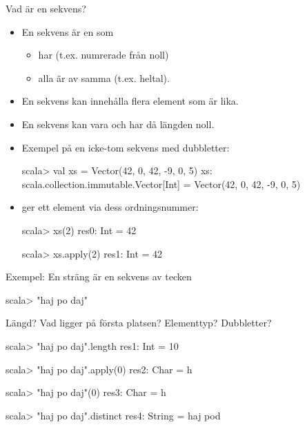 

\ifkompendium\else
{
  \frame[plain]{\centering\Huge\textbf{\color{pink}{ORDNINGEN}\\SPELAR\\ROLL}}
}
\fi


\begin{Slide}{Vad är en sekvens?}  
\begin{itemize}
\item En sekvens är en  som
  \begin{itemize}
  \item har  (t.ex. numrerade från noll)
  \item alla är av samma  (t.ex. heltal).
  \end{itemize}
  \pause
\item En sekvens kan innehålla flera element som är lika.
\item En sekvens kan vara  och har då längden noll.
\item Exempel på en icke-tom sekvens med dubbletter:
\begin{REPLnonum}
scala> val xs = Vector(42, 0, 42, -9, 0, 5)
xs: scala.collection.immutable.Vector[Int] =
  Vector(42, 0, 42, -9, 0, 5)
\end{REPLnonum}
\pause
\item {} ger ett element via dess ordningsnummer:
\begin{REPLnonum}
scala> xs(2)
res0: Int = 42

scala> xs.apply(2)
res1: Int = 42
\end{REPLnonum}
\end{itemize}
\end{Slide}

\begin{Slide}{Exempel: En sträng är en sekvens av tecken}
\begin{REPLnonum}
scala> "haj po daj"
\end{REPLnonum}
Längd? 
Vad ligger på första platsen?
Elementtyp?
Dubbletter?
\pause
\begin{REPLnonum}
scala> "haj po daj".length
res1: Int = 10

scala> "haj po daj".apply(0)
res2: Char = h

scala> "haj po daj"(0)
res3: Char = h

scala> "haj po daj".distinct
res4: String = haj pod
\end{REPLnonum}

\end{Slide}


